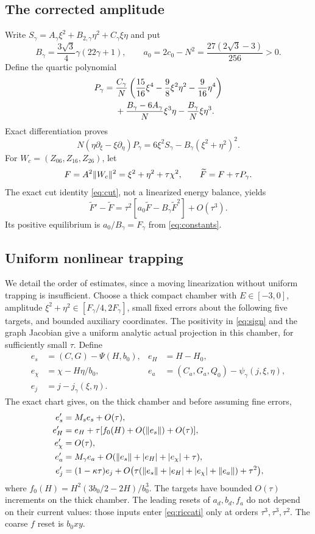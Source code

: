 \documentclass[11pt]{article}
\theoremstyle{remark}\newtheorem{remark}[theorem]{Remark}
\numberwithin{equation}{section}
\begin{document}
\subsection{The corrected amplitude}
Write $S_\gamma=A_\gamma\xi^2+B_{2,\gamma}\eta^2+C_\gamma\xi\eta$ and put
\[
 B_\gamma=\frac{3\sqrt3}{4}\gamma(22\gamma+1),\qquad
 a_0=2c_0-N^2=\frac{27(2\sqrt3-3)}{256}>0.
\]
Define the quartic polynomial
\begin{align}\label{eq:Pgamma}
 P_\gamma={}&\frac{C_\gamma}{N}
 \left(\frac{15}{16}\xi^4-\frac98\xi^2\eta^2-\frac9{16}\eta^4\right)\\
 &+\frac{B_\gamma-6A_\gamma}{N}\xi^3\eta
 -\frac{B_\gamma}{N}\xi\eta^3.\notag
\end{align}
Exact differentiation proves
\[
 N(\eta\partial_\xi-\xi\partial_\eta)P_\gamma
 =6\xi^2S_\gamma-B_\gamma(\xi^2+\eta^2)^2.
\]
For $W_c=(Z_{06},Z_{16},Z_{26})$, let
\[
 F=A^2\lVert W_c\rVert^2=\xi^2+\eta^2+\tau\chi^2,
 \qquad \widetilde F=F+\tau P_\gamma.
\]
The exact cut identity \eqref{eq:cut}, not a linearized energy balance, yields
\begin{equation}\label{eq:logistic}
 \widetilde F'-\widetilde F
 =\tau^2[a_0\widetilde F-B_\gamma\widetilde F^2]+O(\tau^3).
\end{equation}
Its positive equilibrium is $a_0/B_\gamma=F_\gamma$ from \eqref{eq:constants}.

\subsection{Uniform nonlinear trapping}\label{sec:trapping}
We detail the order of estimates, since a moving linearization without uniform trapping is insufficient. Choose a thick compact chamber with $E\in[-3,0]$, amplitude $\xi^2+\eta^2\in[F_\gamma/4,2F_\gamma]$, small fixed errors about the following five targets, and bounded auxiliary coordinates. The positivity in \eqref{eq:sign} and the graph Jacobian give a uniform analytic actual projection in this chamber, for sufficiently small $\tau$. Define
\begin{align*}
 e_s&=(C,G)-\Psi(H,b_0),& e_H&=H-H_0,\\
 e_\chi&=\chi-H\eta/b_0,& e_a&=(C_a,G_a,Q_0)-\psi_\gamma(j,\xi,\eta),\\
 e_j&=j-j_\gamma(\xi,\eta).
\end{align*}
The exact chart gives, on the thick chamber and before assuming fine errors,
\begin{align}\label{eq:hierarchy}
 e_s'&=M_se_s+O(\tau),\\
 e_H'&=e_H+\tau[f_0(H)+O(\lVert e_s\rVert)+O(\tau)],\notag\\
 e_\chi'&=O(\tau),\notag\\
 e_a'&=M_\gamma e_a+O(\lVert e_s\rVert+|e_H|+|e_\chi|+\tau),\notag\\
 e_j'&=(1-\kappa\tau)e_j+
 O\bigl(\tau(\lVert e_s\rVert+|e_H|+|e_\chi|+\lVert e_a\rVert)+\tau^2\bigr),\notag
\end{align}
where $f_0(H)=H^2(3b_0/2-2H)/b_0^3$. The targets have bounded $O(\tau)$ increments on the thick chamber. The leading resets of $a_d,b_d,f_a$ do not depend on their current values: those inputs enter \eqref{eq:riccati} only at orders $\tau^3,\tau^3,\tau^2$. The coarse $f$ reset is $b_0xy$.
\end{document}
